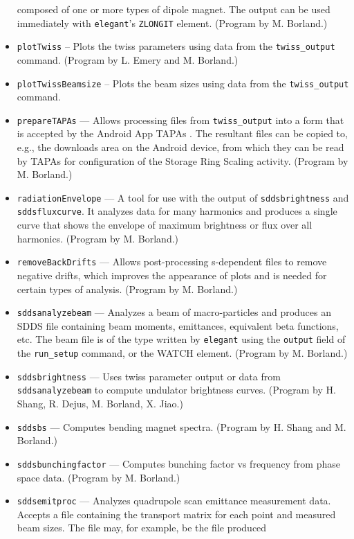 \documentclass[11pt]{article}
\begin{document}
\begin{itemize}
  composed of one or more types of dipole magnet.
 The output can be used immediately with {\tt elegant}'s \verb|ZLONGIT| element.
  (Program by M. Borland.)
\item {\tt plotTwiss} -- Plots the twiss parameters using data from the \verb|twiss_output| command.
  (Program by L. Emery and M. Borland.)
\item {\tt plotTwissBeamsize} -- Plots the beam sizes using data from the \verb|twiss_output| command.
\item {\tt prepareTAPAs} --- Allows processing files from \verb|twiss_output| into a form
  that is accepted by the Android App TAPAs \cite{TAPAs}. The resultant files can be copied to, e.g., 
  the downloads area on the Android device, from which they can be read by TAPAs for configuration of
  the Storage Ring Scaling activity.
  (Program by M. Borland.)
\item {\tt radiationEnvelope} --- A tool for use with the output of {\tt sddsbrightness} and {\tt sddsfluxcurve}.
  It analyzes data for many harmonics and produces a single curve that shows the envelope of maximum
  brightness or flux over all harmonics.
  (Program by M. Borland.)
\item {\tt removeBackDrifts} --- Allows post-processing s-dependent files to remove negative drifts, which
  improves the appearance of plots and is needed for certain types of analysis.
  (Program by M. Borland.)
\item {\tt sddsanalyzebeam} --- Analyzes a beam of macro-particles and produces an SDDS file
        containing beam moments, emittances, equivalent beta functions, etc.  The beam file
        is of the type written by {\tt elegant} using the {\tt output} field of the {\tt run\_setup}
        command, or the WATCH element.  (Program by M. Borland.)
\item {\tt sddsbrightness} --- Uses twiss parameter output or data from {\tt sddsanalyzebeam} to
  compute undulator brightness curves.  (Program by H. Shang, R. Dejus, M. Borland, X. Jiao.)
\item {\tt sddsbs} --- Computes bending magnet spectra.
  (Program by H. Shang and M. Borland.)
\item {\tt sddsbunchingfactor} --- Computes bunching factor vs frequency from phase space data.
  (Program by M. Borland.)
\item {\tt sddsemitproc} --- Analyzes quadrupole scan emittance measurement data.  Accepts a
        file containing the transport matrix for each point and measured beam sizes.  
        The file may, for example, be the file produced

\end{itemize}
\end{document}
